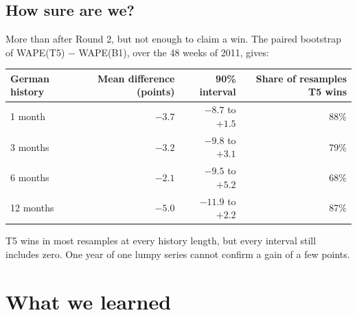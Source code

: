 \documentclass[11pt]{article}
\begin{document}
\subsection*{How sure are we?}

More than after Round 2, but not enough to claim a win. The paired bootstrap of WAPE(T5) $-$ WAPE(B1),
over the 48 weeks of 2011, gives:

\begin{center}
\begin{tabular}{l r r r}
\toprule
German history & Mean difference (points) & 90\% interval & Share of resamples T5 wins \\
\midrule
1 month & $-3.7$ & $-8.7$ to $+1.5$ & 88\% \\
3 months & $-3.2$ & $-9.8$ to $+3.1$ & 79\% \\
6 months & $-2.1$ & $-9.5$ to $+5.2$ & 68\% \\
12 months & $-5.0$ & $-11.9$ to $+2.2$ & 87\% \\
\bottomrule
\end{tabular}
\end{center}

T5 wins in most resamples at every history length, but every interval still includes zero. One year of
one lumpy series cannot confirm a gain of a few points.

\section{What we learned}
\end{document}
